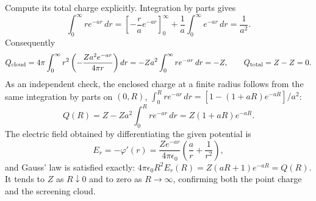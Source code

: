 Compute its total charge explicitly. Integration by parts gives
\[
\int_0^\infty r e^{-ar}\,dr
=\left[-\frac r{a}e^{-ar}\right]_0^\infty
+\frac1a\int_0^\infty e^{-ar}\,dr=\frac1{a^2}.
\]
Consequently
\[
Q_{\rm cloud}=4\pi\int_0^\infty r^2
\left(-\frac{Za^2e^{-ar}}{4\pi r}\right)dr
=-Za^2\int_0^\infty re^{-ar}\,dr=-Z,
\qquad Q_{\rm total}=Z-Z=0.
\]
As an independent check, the enclosed charge at a finite radius follows
from the same integration by parts on $(0,R)$,
$\int_0^Rre^{-ar}\,dr=[1-(1+aR)e^{-aR}]/a^2$:
\[
Q(R)=Z-Za^2\int_0^Rr e^{-ar}\,dr=Z(1+aR)e^{-aR}.
\]
The electric field obtained by differentiating the given potential is
\[
E_r=-\varphi'(r)=\frac{Ze^{-ar}}{4\pi\epsilon_0}
\left(\frac a{r}+\frac1{r^2}\right),
\]
and Gauss' law is satisfied exactly:
$4\pi\epsilon_0R^2E_r(R)=Z(aR+1)e^{-aR}=Q(R)$.
It tends to $Z$ as $R\downarrow0$ and to zero as $R\to\infty$,
confirming both the point charge and the screening cloud.
